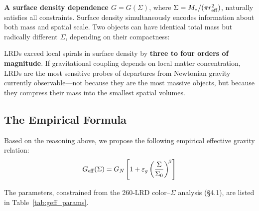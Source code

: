 \documentclass[apj,twocolumn,longbibliography,linenumbers]{aastex701}
\begin{document}
\textbf{A surface density dependence $G = G(\Sigma)$}, where $\Sigma = M_*/(\pi r_{\rm eff}^2)$, naturally satisfies all constraints. Surface density simultaneously encodes information about both mass and spatial scale. Two objects can have identical total mass but radically different $\Sigma$, depending on their compactness:

\begin{table}[h]
\caption{Surface Density Comparison Across Object Types}
\label{tab:sigma_comparison}
\centering
\small
{}
\end{table}

LRDs exceed local spirals in surface density by \textbf{three to four orders of magnitude}. If gravitational coupling depends on local matter concentration, LRDs are the most sensitive probes of departures from Newtonian gravity currently observable---not because they are the most massive objects, but because they compress their mass into the smallest spatial volumes.

\subsection{The Empirical Formula}

Based on the reasoning above, we propose the following empirical effective gravity relation:
\begin{equation}
G_{\rm eff}(\Sigma) = G_N \left[ 1 + \varepsilon_g \left(\frac{\Sigma}{\Sigma_0}\right)^{\!\beta} \right]
\label{eq:Geff_main}
\end{equation}

The parameters, constrained from the 260-LRD color--$\Sigma$ analysis (\S4.1), are listed in Table~\ref{tab:geff_params}.
\end{document}
